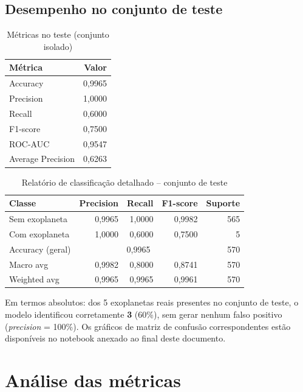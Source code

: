 \documentclass[12pt,a4paper]{article}
\begin{document}
\subsection{Desempenho no conjunto de teste}

\begin{table}[H]
\centering
\caption{Métricas no teste (conjunto isolado)}
\label{tab:metricas_teste}
\begin{tabular}{lr}
\toprule
\textbf{Métrica} & \textbf{Valor} \\
\midrule
Accuracy & 0{,}9965 \\
Precision & 1{,}0000 \\
Recall & 0{,}6000 \\
F1-score & 0{,}7500 \\
ROC-AUC & 0{,}9547 \\
Average Precision & 0{,}6263 \\
\bottomrule
\end{tabular}
\end{table}

\begin{table}[H]
\centering
\caption{Relatório de classificação detalhado -- conjunto de teste}
\begin{tabular}{lrrrr}
\toprule
\textbf{Classe} & \textbf{Precision} & \textbf{Recall} & \textbf{F1-score} & \textbf{Suporte} \\
\midrule
Sem exoplaneta & 0{,}9965 & 1{,}0000 & 0{,}9982 & 565 \\
Com exoplaneta & 1{,}0000 & 0{,}6000 & 0{,}7500 & 5 \\
\midrule
Accuracy (geral) & \multicolumn{3}{c}{0{,}9965} & 570 \\
Macro avg & 0{,}9982 & 0{,}8000 & 0{,}8741 & 570 \\
Weighted avg & 0{,}9965 & 0{,}9965 & 0{,}9961 & 570 \\
\bottomrule
\end{tabular}
\end{table}

Em termos absolutos: dos 5 exoplanetas reais presentes no conjunto de teste, o modelo identificou corretamente \textbf{3} (60\%), sem gerar nenhum falso positivo (\textit{precision} = 100\%). Os gráficos de matriz de confusão correspondentes estão disponíveis no notebook anexado ao final deste documento.


\section{Análise das métricas}
\end{document}

